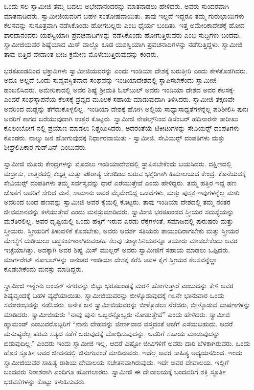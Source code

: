  ಒಂದು ಸಲ ಸ್ವಾಮೀಜಿ ತಮ್ಮ ಬದಲು ಅಭೇದಾನಂದರನ್ನು ಮಾತನಾಡಲು ಹೇಳಿದರು. ಅವರು ಸುಂದರವಾಗಿ ಮಾತನಾಡಿದರು. ಸ್ವಾಮೀಜಿಯವರಿಗೆ ಬಹಳ ಸಂತೋಷವಾಯಿತು. ತಾವು ಇಲ್ಲದೆ ಇದ್ದರೂ ತಮ್ಮ ಗುರುಭಾಯಿಗಳು ಕೆಲಸವನ್ನು ಸುಸೂತ್ರವಾಗಿ ನಡೆಸಿಕೊಂಡು ಹೋಗಬಲ್ಲರು ಎಂಬ ಧೈರ್ಯ ಬಂದಿತು. ಇತ್ತ ಅಮೇರಿಕಾದೇಶಕ್ಕೆ ಹೋದ ಶಾರದಾನಂದರು ಯಶಸ್ವಿಯಾಗಿ ಪ್ರವಚನಾದಿಗಳನ್ನು ನಡೆಸಿಕೊಂಡು ಹೋಗುತ್ತಿರುವರು ಎಂಬ ಸುದ್ದಿಗಳು ಬಂದವು. ಸ್ವಾಮೀಜಿಯವರ ಶಿಷ್ಯೆಯಾದ ಮಿಸ್ ವಾಲ್ಡೊ ಕೂಡ ಯಶಸ್ವಿಯಾಗಿ ಪ್ರವಚನಾದಿಗಳನ್ನು ನಡೆಸುತ್ತಿದ್ದಳು. ಸ್ವಾಮೀಜಿ ತಾವು ಬಿತ್ತಿದ ವೇದಾಂತ ಬೀಜ ಕ್ರಮೇಣ ಮೊಳೆಯುತ್ತಿರುವುದನ್ನು ಕಂಡರು. 

 ಭರತಖಂಡದಿಂದ ಭಕ್ತಾದಿಗಳು ಸ್ವಾಮೀಜಿಯವರನ್ನು ಎಂದು ಇಂಡಿಯಾ ದೇಶಕ್ಕೆ ಬರುತ್ತೀರಿ ಎಂದು ಕೇಳತೊಡಗಿದರು. ಅದೂ ಅಲ್ಲದೆ ಒಂದು ಸುವ್ಯವಸ್ಥಿತವಾದ ಸಂಘವನ್ನು ಇಂಡಿಯಾದೇಶದಲ್ಲಿ ಸ್ಥಾಪಿಸಬೇಕೆಂದು ಸ್ವಾಮೀಜಿ ಹಂಬಲಿಸಿದರು. ಅಮೇರಿಕಾದಲ್ಲಿ ಅವರ ಶಿಷ್ಯೆ ಶ‍್ರೀಮತಿ ಓಲ್‌ಬುಲ್ ಅವರು ಇಂಡಿಯಾ ದೇಶದ ಅವರ ಕೆಲಸಕ್ಕೆ-ಎಂದರೆ ಸಂಘಸ್ಥಾಪನೆಯ ಕೆಲಸಕ್ಕೆ ದ್ರವ್ಯದ ಮೂಲಕ ಸಹಾಯ ಮಾಡುವುದಾಗಿ ತಿಳಿಸಿದರು. ಸ್ವಾಮೀಜಿ ತಕ್ಷಣವೇ ಅವರಿಂದ ದುಡ್ಡನ್ನು ತೆಗೆದುಕೊಳ್ಳಲಿಲ್ಲ. ಇಂಡಿಯಾ ದೇಶಕ್ಕೆ ಹೋಗಿ ಅಲ್ಲಿಯ ಸಾಧ್ಯಾಸಾಧ್ಯತೆಗಳನ್ನೆಲ್ಲ ಪರಿಶೀಲಿಸಿ ಪುನಃ ಅವರಿಗೆ ಕಾಗದ ಬರೆಯುವುದಾಗಿ ಉತ್ತರ ಕೊಟ್ಟರು. ಸ್ವಾಮೀಜಿ ನೇಪಲ್ಸ್‌ನಿಂದ ಡಿಸೆಂಬರ್ ಹದಿನಾರನೇ ತಾರೀಖು ಕೊಲಂಬೋಗೆ ನಲ್ಲಿ ಪ್ರಯಾಣ ಮಾಡಲು ನಿಶ್ಚಯಿಸಿದರು. ಅದರಂತೆಯೆ ಟಿಕೀಟುಗಳನ್ನು ಸೇವಿಯರ್ಸ್‍‍ ದಂಪತಿಗಳು ಕೊಂಡರು. ನಾಲ್ಕು ಜನ ಹೋಗುವುದಕ್ಕೆ ನಿರ್ಧಾರವಾಯಿತು - ಸ್ವಾಮೀಜಿ, ಸೇವಿಯರ್ಸ್‍‍ ದಂಪತಿಗಳು ಮತ್ತು ಶೀಘ್ರಲಿಪಿಕಾರ ಗುಡ್‌ವಿನ್ ಎಂಬುವರು.

 ಸ್ವಾಮೀಜಿ ಮೂರು ಕೇಂದ್ರಗಳನ್ನು ಮೊದಲು ಇಂಡಿಯಾದೇಶದಲ್ಲಿ ಸ್ಥಾಪಿಸಬೇಕೆಂದು ಬಯಸಿದರು. ದಕ್ಷಿಣದಲ್ಲಿ ಮದ್ರಾಸು, ಉತ್ತರದಲ್ಲಿ ಕಲ್ಕತ್ತ ಮತ್ತು ಪೌರಾತ್ಯ ದೇಶದಿಂದ ಬರುವ ಭಕ್ತರಿಗಾಗಿ ಹಿಮಾಲಯದ ಕೇಂದ್ರ. ಕೊನೆಯದಕ್ಕೆ ಸೇವಿಯರ್ಸ್‍‍ ದಂಪತಿಗಳು ತಮ್ಮ ಸರ್ವಸ್ವವನ್ನು ಧಾರೆ ಎರೆಯುತ್ತೇವೆ ಎಂದು ಹೇಳಿದ್ದರು. ತಮ್ಮ ಹತ್ತಿರ ಇದ್ದ ಹಣ ಜೊತೆಗೆ ಅವರಿಗೆ ಸೇರಿದ ಮನೆ, ಸಾಮಾನು ಅವರ ಮೈಮೇಲಿದ್ದ ಒಡವೆಗಳು, ಮತ್ತು ಪುಸ್ತಕ ಇವುಗಳನ್ನೆಲ್ಲ ಮಾರಿ ಅದರಿಂದ ಬಂದ ಹಣವನ್ನು ಸ್ವಾಮೀಜಿ ಅವರ ಕೈಯಲ್ಲಿ ಕೊಟ್ಟರು. ತಾವು ಇಂಡಿಯಾ ದೇಶದಲ್ಲಿ ತಮ್ಮ ನಂತರ ಜೀವಮಾನವನ್ನು ಕಳೆಯುತ್ತೇವೆ ಎಂದು ಮನಸ್ಸುಮಾಡಿದರು. ಸ್ವಾಮೀಜಿ ಭರತಖಂಡದ ಸ್ತ್ರೀಯರ ಸಮಸ್ಯೆಯನ್ನು ಮರೆತಿರಲಿಲ್ಲ. ಅವರ ದೃಷ್ಟಿಯಲ್ಲಿ ಒಂದು ಹಕ್ಕಿಗೆ ಇರುವ ಎರಡು ರೆಕ್ಕೆಗಳಂತೆ, ಸಮಾಜದಲ್ಲಿ ಪುರುಷರು ಮತ್ತು ಸ್ತ್ರೀಯರು. ಸ್ತ್ರೀಯರಿಗೆ ತಿಳುವಳಿಕೆ ಕೊಡಬೇಕು, ಅವರು ಆದರ್ಶ ಸತಿಯರು ತಾಯಂದಿರಾಗಬೇಕು ಮತ್ತು ಸ್ತ್ರೀಯರ ಮೇಲ್ಮೆಗೆ ದುಡಿಯಲು ಬದ್ಧಕಂಕಣರಾಗಿರುವಂತಹ ಕೆಲವು ಸಂನ್ಯಾಸಿನಿಯರನ್ನೂ ತಯಾರು ಮಾಡಬೇಕೆಂದು ಅವರ ಇಚ್ಛೆಯಾಗಿತ್ತು. ಅದಕ್ಕಾಗಿ ಅವರ ಶಿಷ್ಯೆ ಮಿಸ್ ಮುಲ್ಲರ್ ಅವರು ಸ್ವಾಮೀಜಿಗೆ ಸಹಾಯ ಮಾಡಲು ಒಪ್ಪಿದರು. ಮಾರ್ಗರೇಟ್ ನೋಬಲ್‌ಳನ್ನು ಅನಂತರ ಇಂಡಿಯಾ ದೇಶಕ್ಕೆ ಕರೆಸಿ ಅವಳ ಕೈಗೆ ಸ್ತ್ರೀಯರ ಕೆಲಸವನ್ನೆಲ್ಲಾ ಕೊಡಬೇಕೆಂದು ಮನಸ್ಸು ಮಾಡಿದ್ದರು. 

 ಸ್ವಾಮೀಜಿ ಇನ್ನೇನು ಲಂಡನ್ ನಗರವನ್ನು ಬಿಟ್ಟು ಭರತಖಂಡಕ್ಕೆ ಮರಳಿ ಹೋಗುತ್ತಾರೆ ಎಂಬುದನ್ನು ಕೇಳಿ ಅವರ ಶಿಷ್ಯವೃಂದಕ್ಕೆ ಬಹಳ ವ್ಯಥೆಯಾಯಿತು. ಸ್ವಾಮೀಜಿಯವರನ್ನು ಬೀಳ್ಕೊಡುವುದಕ್ಕೆ ೧೩ನೇ ಭಾನುವಾರ ಒಂದು ಸಮಾರಂಭವನ್ನು ನಡೆಸಿದರು. ಅನೇಕ ಜನ ಸ್ವಾಮೀಜಿಯವರನ್ನು ಬೀಳ್ಕೊಡಲು ನೆರೆದರು, ಬೀಳ್ಕೊಡುವ ಭಾಷಣಗಳನ್ನು ಮಾಡಿದರು. ಸ್ವಾಮೀಜಿಯರು “ನಾವು ಪುನಃ ಒಬ್ಬರನ್ನೊಬ್ಬರು ನೋಡುತ್ತೇವೆ” ಎಂದು ಹೇಳಿದರು. ಸ್ವಾಮೀಜಿ ಹ್ಯಾಮಂಡ್ ಎಂಬುವರೊಬ್ಬರಿಗೆ “ನಾನು ದೇಹವನ್ನು ಜೀರ್ಣವಾದ ವಸ್ತ್ರದಂತೆ ಆಚೆಗೆ ಎಸೆಯಬಹುದು. ಆದರೆ ಮನುಷ್ಯರೆಲ್ಲ ಪರಮ ಸತ್ಯದ ಕಡೆಗೆ ಬರುವುದಕ್ಕೆ ಬೋಧಿಸುವುದನ್ನು, ಅವರಿಗೆ ಸಹಾಯ ಮಾಡುವುದನ್ನು ಬಿಡುವುದಿಲ್ಲ.” ಎಂದರು ಇಂದು ಸ್ವಾಮೀಜಿ ಇಲ್ಲ. ಆದರೆ ಎಷ್ಟೋ ಜೀವಿಗಳಿಗೆ ಅವರು ದಾರಿ ಬೆಳಕಾಗಿರುವರು. ಒಂದು ಹೊಸ ಸ್ಫೂರ್ತಿ ಅವರ ಜೀವನದಲ್ಲಿ ಜಿನುಗುವಂತೆ ಮಾಡಿರುವರು. ಇದೆಲ್ಲ ಅವರ ಸಾಹಿತ್ಯ ಅಧ್ಯಯನದಿಂದ. ಇಂದು ಸ್ವಾಮೀಜಿಯವರ ಸಾಹಿತ್ಯ ರಾಶಿಯ ದೇವಾಲಯ ಸಚೇತನವಾಗಿರುವುದು. ಇದೇ ಅವರ ದೇವಾಲಯ. ಇಲ್ಲಿಗೆ ಬಂದವರು ನಿರಾಶರಾಗಿ ಎಂದಿಗೂ ಹೋಗಲಾರರು. ಸ್ವಾಮೀಜಿ ಈ ದೇವಾಲಯಕ್ಕೆ ಬಂದವರಿಗೆ ಶಕ್ತಿ ಸ್ಫೂರ್ತಿ ಭರವಸೆಗಳನ್ನು ಕೊಟ್ಟು ಕಳುಹಿಸುವರು. 

